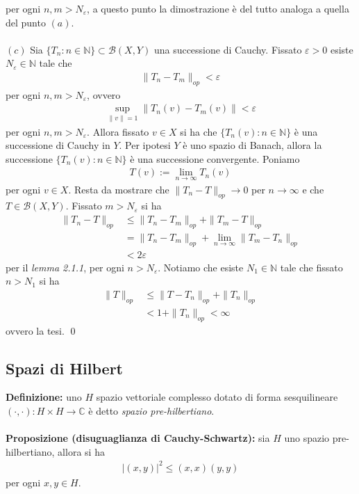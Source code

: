 \documentclass{article}
\numberwithin{equation}{subsection}
\begin{document}
per ogni $n, m > N_\varepsilon$, a questo punto la dimostrazione è del tutto analoga a quella del punto $(a)$. \\ \\
$(c)$ Sia $\{T_n : n \in \mathbb{N}\} \subset \mathcal{B}(X, Y)$ una successione di Cauchy. Fissato $\varepsilon > 0$ esiste $N_\varepsilon \in \mathbb{N}$ tale che
\begin{align*}
    \|T_n - T_m\|_{op} < \varepsilon 
\end{align*} 
per ogni $n, m > N_\varepsilon$, ovvero
\begin{align*}
    \sup_{\|v\| = 1}\|T_n(v) - T_m(v)\| < \varepsilon 
\end{align*}
per ogni $n, m > N_\varepsilon$. Allora fissato $v \in X$ si ha che $\{T_n(v) : n \in \mathbb{N}\}$ è una successione di Cauchy in $Y$. Per ipotesi $Y$ è uno spazio di Banach,
allora la successione $\{T_n(v) : n \in \mathbb{N}\}$ è una successione convergente. Poniamo
\begin{align*}
    T(v) := \lim_{n \rightarrow \infty}T_n(v) 
\end{align*}
per ogni $v \in X$. Resta da mostrare che $\|T_n - T\|_{op} \rightarrow 0$ per $n \rightarrow \infty$ e che $T \in \mathcal{B}(X, Y)$. Fissato $m > N_\varepsilon$ si ha
\begin{align*}
    \|T_n - T\|_{op} &\leq \|T_n - T_m\|_{op} + \|T_m - T\|_{op}  \\
    &= \|T_n - T_m\|_{op} + \lim_{n \rightarrow \infty}\|T_m - T_n\|_{op}  \\
    &< 2\varepsilon 
\end{align*}
per il \textit{lemma 2.1.1}, per ogni $n > N_\varepsilon$. Notiamo che esiste $N_1 \in \mathbb{N}$ tale che fissato $n > N_1$ si ha
\begin{align*}
    \|T\|_{op} &\leq \|T - T_n\|_{op} + \|T_n\|_{op}  \\
    &< 1 + \|T_n\|_{op} < \infty 
\end{align*}
ovvero la tesi. \qed

\newpage
\subsection{Spazi di Hilbert}
\textbf{Definizione:} uno $H$ spazio vettoriale complesso dotato di forma sesquilineare $(\cdot, \cdot) : H \times H \longrightarrow \mathbb{C}$ è detto \textit{spazio pre-hilbertiano}. \\ \\
\textbf{Proposizione (disuguaglianza di Cauchy-Schwartz):} sia $H$ uno spazio pre-hilbertiano, allora si ha 
\begin{align*}
    |(x, y)|^2 \leq (x, x)(y, y) 
\end{align*}
per ogni $x, y \in H$. \\
\end{document}
